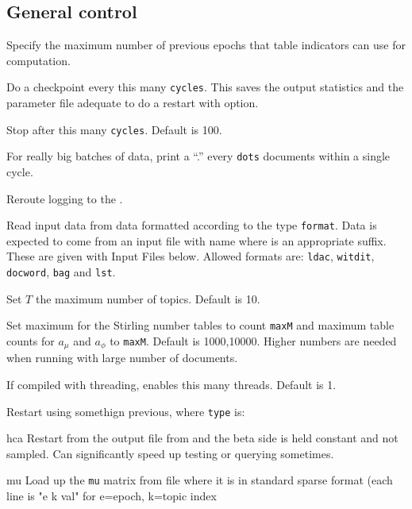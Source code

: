 \documentclass[a4paper,english]{article}
\begin{document}
\subsection{General control}
\begin{Description}\setlength{\itemsep}{0cm}
\item[\OptArg{-b}{epochs}] 
Specify the maximum number of previous epochs that table indicators can use for computation.
\item[\OptArg{-c}{cycles}] 
Do a checkpoint every this many \texttt{cycles}.
This saves the output statistics and the parameter file
adequate to do a restart with  option.
\item[\OptArg{-C}{cycles}] 
Stop after this many \texttt{cycles}.
Default is 100. 
\item[\OptArg{-d}{dots}] 
For really big batches of data, print a 
``.'' every \texttt{dots} documents within a single cycle.
\item[\Opt{-e}]
Reroute logging to the .
\item[\OptArg{-f}{format}] 
Read input data from data formatted according to
the type \texttt{format}.  Data is expected to come from
an input file with name  where
 is an appropriate suffix.
These are given with Input Files below.
Allowed formats are:
\texttt{ldac}, \texttt{witdit}, \texttt{docword}, 
\texttt{bag}
and \texttt{lst}.
\item[\OptArg{-K}{topics}] 
Set $T$ the maximum number of topics.
Default is 10.
\item[\OptArg{-N}{maxN,maxM}] 
Set maximum for the Stirling number tables
to count \texttt{maxM} and maximum table counts for $a_{\mu}$ and $a_{\phi}$ to \texttt{maxM}.
Default is 1000,10000. Higher numbers are needed when running with large number of documents.
\item[\OptArg{-q}{threads}] If compiled with threading, enables
this many threads.  Default is 1.
\item[\OptArg{-r}{type}]
Restart using somethign previous, where \texttt{type} is:
\begin{Description}[type]\setlength{\itemsep}{0cm}
\item[hca]
Restart from the output file from 
and the beta side is held constant and not sampled.
Can significantly speed up testing or querying sometimes.
\item[mu]
Load up the \texttt{mu} matrix from file 
where it is in standard sparse format
(each line is "e k val" for e=epoch, k=topic index

\end{Description}
\end{Description}
\end{document}

